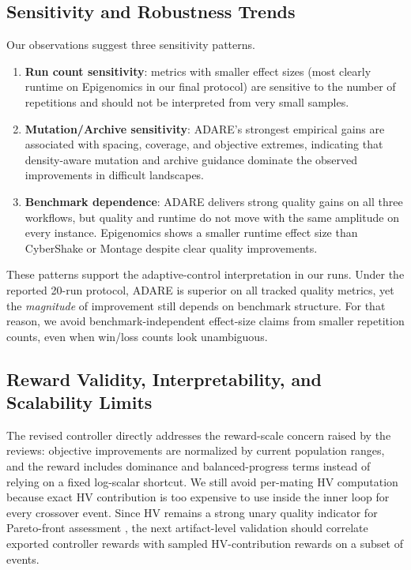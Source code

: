 \documentclass[runningheads]{llncs}
\begin{document}
\subsection{Sensitivity and Robustness Trends}
Our observations suggest three sensitivity patterns.
\begin{enumerate}
    \item \textbf{Run count sensitivity}: metrics with smaller effect sizes (most clearly runtime on Epigenomics in our final protocol) are sensitive to the number of repetitions and should not be interpreted from very small samples.
    \item \textbf{Mutation/Archive sensitivity}: ADARE's strongest empirical gains are associated with spacing, coverage, and objective extremes, indicating that density-aware mutation and archive guidance dominate the observed improvements in difficult landscapes.
    \item \textbf{Benchmark dependence}: ADARE delivers strong quality gains on all three workflows, but quality and runtime do not move with the same amplitude on every instance. Epigenomics shows a smaller runtime effect size than CyberShake or Montage despite clear quality improvements.
\end{enumerate}

These patterns support the adaptive-control interpretation in our runs. Under the reported 20-run protocol, ADARE is superior on all tracked quality metrics, yet the \emph{magnitude} of improvement still depends on benchmark structure. For that reason, we avoid benchmark-independent effect-size claims from smaller repetition counts, even when win/loss counts look unambiguous.

\subsection{Reward Validity, Interpretability, and Scalability Limits}
The revised controller directly addresses the reward-scale concern raised by the reviews: objective improvements are normalized by current population ranges, and the reward includes dominance and balanced-progress terms instead of relying on a fixed log-scalar shortcut. We still avoid per-mating HV computation because exact HV contribution is too expensive to use inside the inner loop for every crossover event. Since HV remains a strong unary quality indicator for Pareto-front assessment \cite{zitzler2003performance}, the next artifact-level validation should correlate exported controller rewards with sampled HV-contribution rewards on a subset of events.
\end{document}
